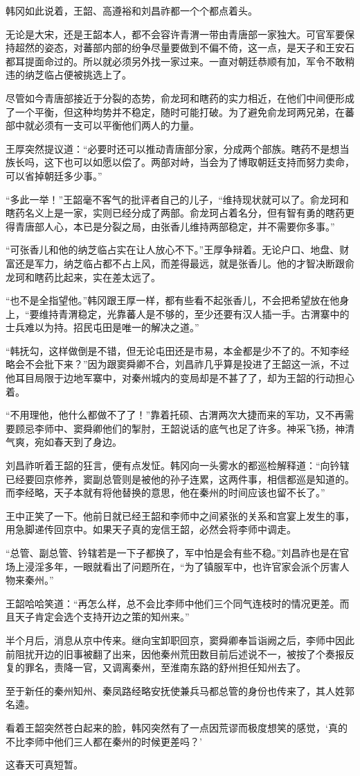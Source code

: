 韩冈如此说着，王韶、高遵裕和刘昌祚都一个个都点着头。

无论是大宋，还是王韶本人，都不会容许青渭一带由青唐部一家独大。可官军要保持超然的姿态，对蕃部内部的纷争尽量要做到不偏不倚，这一点，是天子和王安石都耳提面命过的。所以就必须另外找一家过来。一直对朝廷恭顺有加，军令不敢稍违的纳芝临占便被挑选上了。

尽管如今青唐部接近于分裂的态势，俞龙珂和瞎药的实力相近，在他们中间便形成了一个平衡，但这种均势并不稳定，随时可能打破。为了避免俞龙珂两兄弟，在蕃部中就必须有一支可以平衡他们两人的力量。

王厚突然提议道：“必要时还可以推动青唐部分家，分成两个部族。瞎药不是想当族长吗，这下也可以如愿以偿了。两部对峙，当会为了博取朝廷支持而努力卖命，可以省掉朝廷多少事。”

“多此一举！”王韶毫不客气的批评者自己的儿子，“维持现状就可以了。俞龙珂和瞎药名义上是一家，实则已经分成了两部。俞龙珂占着名分，但有智有勇的瞎药更得青唐部人心，本已是分裂之局，由张香儿维持两部稳定，并不需要你多事。”

“可张香儿和他的纳芝临占实在让人放心不下。”王厚争辩着。无论户口、地盘、财富还是军力，纳芝临占都不占上风，而差得最远，就是张香儿。他的才智决断跟俞龙珂和瞎药比起来，实在差太远了。

“也不是全指望他。”韩冈跟王厚一样，都有些看不起张香儿，不会把希望放在他身上，“要维持青渭稳定，光靠蕃人是不够的，至少还要有汉人插一手。古渭寨中的士兵难以为持。招民屯田是唯一的解决之道。”

“韩抚勾，这样做倒是不错，但无论屯田还是市易，本金都是少不了的。不知李经略会不会批下来？”因为跟窦舜卿不合，刘昌祚几乎算是投进了王韶这一派，不过他耳目局限于边地军寨中，对秦州城内的变局却是不甚了了，却为王韶的行动担心着。

“不用理他，他什么都做不了了！”靠着托硕、古渭两次大捷而来的军功，又不再需要顾忌李师中、窦舜卿他们的掣肘，王韶说话的底气也足了许多。神采飞扬，神清气爽，宛如春天到了身边。

刘昌祚听着王韶的狂言，便有点发怔。韩冈向一头雾水的都巡检解释道：“向钤辖已经要回京修养，窦副总管则是被他的孙子连累，这两件事，相信都巡是知道的。而李经略，天子本就有将他替换的意思，他在秦州的时间应该也留不长了。”

王中正笑了一下。他前日就已经王韶和李师中之间紧张的关系和宫宴上发生的事，用急脚递传回京中。如果天子真的宠信王韶，必然会将李师中调走。

“总管、副总管、钤辖若是一下子都换了，军中怕是会有些不稳。”刘昌祚也是在官场上浸淫多年，一眼就看出了问题所在，“为了镇服军中，也许官家会派个厉害人物来秦州。”

王韶哈哈笑道：“再怎么样，总不会比李师中他们三个同气连枝时的情况更差。而且天子肯定会选个支持开边之策的知州来。”

半个月后，消息从京中传来。继向宝卸职回京，窦舜卿奉旨诣阙之后，李师中因此前阻扰开边的旧事被翻了出来，因他秦州荒田数目前后述说不一，被按了个奏报反复的罪名，责降一官，又调离秦州，至淮南东路的舒州担任知州去了。

至于新任的秦州知州、秦凤路经略安抚使兼兵马都总管的身份也传来了，其人姓郭名逵。

看着王韶突然苍白起来的脸，韩冈突然有了一点因荒谬而极度想笑的感觉，‘真的不比李师中他们三人都在秦州的时候更差吗？’

这春天可真短暂。

